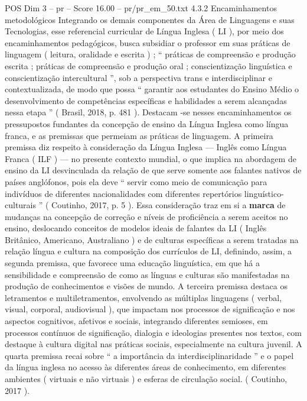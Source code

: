 \begin{textsample}{POS Dim 3 – pr – Score 16.00 – pr/pr\_em\_50.txt}  \label{ex:f3_pos_160}
4.3.2 Encaminhamentos metodológicos Integrando os demais componentes da Área de Linguagens e suas Tecnologias, esse referencial curricular de Língua Inglesa ( LI ), por meio dos encaminhamentos pedagógicos, busca subsidiar o professor em suas práticas de linguagem ( leitura, oralidade e escrita ) ; “ práticas de compreensão e produção escrita ; práticas de compreensão e produção oral ; conscientização linguística e conscientização intercultural ”, sob a perspectiva trans e interdisciplinar e contextualizada, de modo que possa “ garantir aos estudantes do Ensino Médio o desenvolvimento de competências específicas e habilidades a serem alcançadas nessa etapa ” ( Brasil, 2018, p. 481 ).
Destacam -se nesses encaminhamentos os pressupostos fundantes da concepção de ensino da Língua Inglesa como língua franca, e as premissas que permeiam as práticas de linguagem.
A primeira premissa diz respeito à consideração da Língua Inglesa — Inglês como Língua Franca ( ILF ) — no presente contexto mundial, o que implica na abordagem de ensino da LI desvinculada da relação de que serve somente aos falantes nativos de países anglófonos, pois ela deve “ servir como meio de comunicação para indivíduos de diferentes nacionalidades com diferentes repertórios linguístico-culturais ” ( Coutinho, 2017, p. 5 ).
Essa consideração traz em si a \textbf{marca} de mudanças na concepção de correção e níveis de proficiência a serem aceitos no ensino, deslocando conceitos de modelos ideais de falantes da LI ( Inglês Britânico, Americano, Australiano ) e de culturas específicas a serem tratadas na relação língua e cultura na composição dos currículos de LI, definindo, assim, a segunda premissa, que favorece uma educação linguística, em que há a sensibilidade e compreensão de como as línguas e culturas são manifestadas na produção de conhecimentos e visões de mundo.
A terceira premissa destaca os letramentos e multiletramentos, envolvendo as múltiplas linguagens ( verbal, visual, corporal, audiovisual ), que impactam nos processos de significação e nos aspectos cognitivos, afetivos e sociais, integrando diferentes semioses, em processos contínuos de significação, dialogia e ideologias presentes nos textos, com destaque à cultura digital nas práticas sociais, especialmente na cultura juvenil.
A quarta premissa recai sobre “ a importância da interdisciplinaridade ” e o papel da língua inglesa no acesso às diferentes áreas de conhecimento, em diferentes ambientes ( virtuais e não virtuais ) e esferas de circulação social. ( Coutinho, 2017 ).

\end{textsample}
